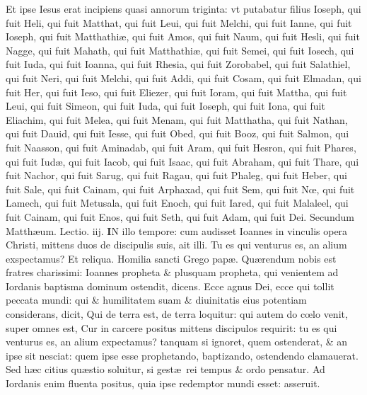 \documentclass[a5paper,10pt]{book}
\def\ae{æ}
\def\oe{œ}
\begin{document}
\begin{multicols*}{2}
Et ipse Iesus erat incipiens quasi annorum triginta: vt putabatur filius Ioseph, qui fuit Heli, qui fuit Matthat, qui fuit Leui, qui fuit Melchi,
qui fuit Ianne, qui fuit Ioseph, qui fuit Matthathi\ae , qui fuit Amos, qui fuit Naum, qui fuit Hesli, qui fuit Nagge, qui fuit Mahath, qui fuit Matthathi\ae , qui fuit Semei, qui fuit Iosech, qui fuit Iuda, qui fuit Ioanna, qui fuit Rhesia, qui fuit Zorobabel, qui fuit Salathiel, qui fuit Neri, qui fuit Melchi, qui fuit Addi, qui fuit Cosam, qui fuit Elmadan, qui fuit Her, qui fuit Ieso, qui fuit Eliezer, qui fuit Ioram, qui fuit Mattha, qui fuit Leui, qui fuit Simeon, qui fuit Iuda, qui fuit Ioseph, qui fuit Iona, qui fuit Eliachim, qui fuit Melea, qui fuit Menam, qui fuit Matthatha, qui fuit Nathan, qui fuit Dauid, qui fuit Iesse, qui fuit Obed, qui fuit Booz, qui fuit Salmon, qui fuit Naasson, qui fuit Aminadab, qui fuit Aram, qui fuit Hesron, qui fuit Phares, qui fuit Iud\ae , qui fuit Iacob, qui fuit Isaac, qui fuit Abraham, qui fuit Thare, qui fuit Nachor, qui fuit Sarug, qui fuit Ragau, qui fuit Phaleg, qui fuit Heber, qui fuit Sale, qui fuit Cainam, qui fuit Arphaxad, qui fuit Sem, qui fuit N\oe , qui fuit Lamech, qui fuit Metusala, qui fuit Enoch, qui fuit Iared, qui fuit Malaleel, qui fuit Cainam, qui fuit Enos, qui fuit Seth, qui fuit Adam, qui fuit Dei.
\newline \color{red} Secundum Matth\ae um. \hfill Lectio. iij. \color{black}
\vspace{-.25em}
\lettrine[lines=2]{\bfseries \color{red} I}{}N illo tempore: cum audisset Ioannes in vinculis opera Christi, mittens duos de discipulis suis, ait illi. Tu es qui venturus es, an alium exspectamus?
\newline \color{red} Et reliqua. Homilia sancti Grego pap\ae. \color{black}
\newline \color{red} Q\color{black}u\ae rendum nobis est fratres %
charissimi: Ioannes propheta \& plusquam propheta, qui venientem ad Iordanis baptisma dominum ostendit, dicens.
Ecce agnus Dei, ecce qui tollit peccata mundi: qui \& humilitatem suam \& diuinitatis eius potentiam considerans, dicit, Qui de terra est, de terra loquitur: qui autem do c\oe lo venit, super omnes est, Cur in carcere positus mittens discipulos requirit: tu es qui venturus es, an alium expectamus? tanquam si ignoret, quem ostenderat, \& an ipse sit nesciat: quem ipse esse prophetando, baptizando, ostendendo clamauerat.
Sed h\ae c citius qu\ae stio soluitur, si gest\ae \ rei tempus \& ordo pensatur.
Ad Iordanis enim fluenta positus, quia ipse redemptor mundi esset: asseruit.

\end{multicols*}
\end{document}
